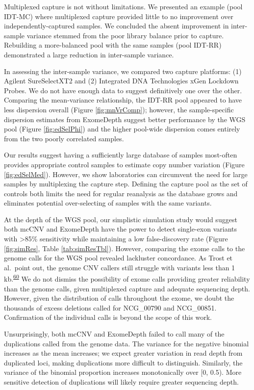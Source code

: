 \documentclass[11pt,letterpaper]{book}
\begin{document}
Multiplexed capture is not without limitations.
We presented an example (pool IDT-MC) where multiplexed capture provided little to no improvement over independently-captured samples.
We concluded the absent improvement in inter-sample variance stemmed from the poor library balance prior to capture.
Rebuilding a more-balanced pool with the same samples (pool IDT-RR) demonstrated a large reduction in inter-sample variance.

In assessing the inter-sample variance, we compared two capture platforms: (1) Agilent SureSelectXT2 and (2) Integrated DNA Technologies xGen Lockdown Probes.
We do not have enough data to suggest definitively one over the other.
Comparing the mean-variance relationship, the IDT-RR pool appeared to have less dispersion overall (Figure \ref{fig:mnVrComp}); however, the sample-specific dispersion estimates from ExomeDepth suggest better performance by the WGS pool (Figure \ref{fig:edSelPhi}) and the higher pool-wide dispersion comes entirely from the two poorly correlated samples.

Our results suggest having a sufficiently large database of samples most-often provides appropriate control samples to estimate copy number variation (Figure \ref{fig:edSelMed}).
However, we show laboratories can circumvent the need for large samples by multiplexing the capture step.
Defining the capture pool as the set of controls both limits the need for regular reanalysis as the database grows and eliminates potential over-selecting of samples with the same variants.

At the depth of the WGS pool, our simplistic simulation study would suggest both mcCNV and ExomeDepth have the power to detect single-exon variants with \textgreater85\% sensitivity while maintaining a low false-discovery rate (Figure \ref{fig:simRes}, Table \ref{tab:simResTbl}).
However, comparing the exome calls to the genome calls for the WGS pool revealed lackluster concordance.
As Trost et al.~point out, the genome CNV callers still struggle with variants less than 1 kb.\textsuperscript{\protect\hyperlink{ref-trost:2018aa}{60}}
We do not dismiss the possibility of exome calls providing greater reliability than the genome calls, given multiplexed capture and adequate sequencing depth.
However, given the distribution of calls throughout the exome, we doubt the thousands of excess deletions called for NCG\_00790 and NCG\_00851.
Confirmation of the individual calls is beyond the scope of this work.

Unsurprisingly, both mcCNV and ExomeDepth failed to call many of the duplications called from the genome data.
The variance for the negative binomial increases as the mean increases; we expect greater variation in read depth from duplicated loci, making duplications more difficult to distinguish.
Similarly, the variance of the binomial proportion increases monotonically over {[}0, 0.5).
More sensitive detection of duplications will likely require greater sequencing depth.
\end{document}
